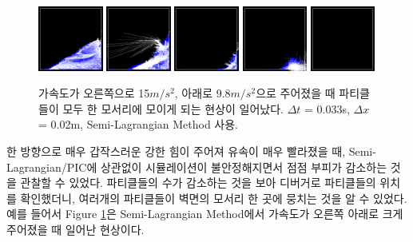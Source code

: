 \documentclass[12pt, A4]{article}
\begin{document}
\begin{figure}[h!]
  \centering
  \includegraphics[width=0.19\textwidth]{explode1}
  \includegraphics[width=0.19\textwidth]{explode2}
  \includegraphics[width=0.19\textwidth]{explode3}
  \includegraphics[width=0.19\textwidth]{explode4}
  \includegraphics[width=0.19\textwidth]{explode5}
  \caption{가속도가 오른쪽으로 15$m/s^2$, 아래로 9.8$m/s^2$으로 주어졌을 때 파티클들이 모두 한 모서리에 모이게 되는 현상이 일어났다. $\Delta t$ = 0.033s, $\Delta x$ = 0.02m, Semi-Lagrangian Method 사용.}
  \label{explode}
\end{figure}


한 방향으로 매우 갑작스러운 강한 힘이 주어져 유속이 매우 빨라졌을 때, Semi-Lagrangian/PIC에 상관없이 시뮬레이션이 불안정해지면서 점점 부피가 감소하는 것을 관찰할 수 있었다. 파티클들의 수가 감소하는 것을 보아 디버거로 파티클들의 위치를 확인했더니, 여러개의 파티클들이 벽면의 모서리 한 곳에 뭉치는 것을 알 수 있었다. 예를 들어서 Figure \ref{explode}은 Semi-Lagrangian Method에서 가속도가 오른쪽 아래로 크게 주어졌을 때 일어난 현상이다. 
\end{document}
